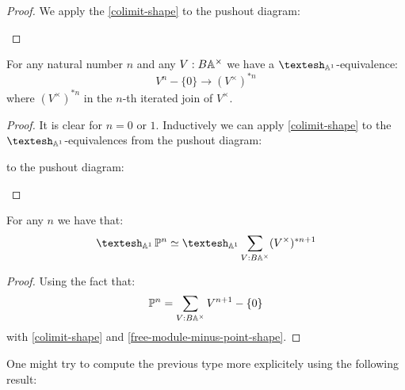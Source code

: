 \begin{proof}
We apply the \cref{colimit-shape} to the pushout diagram:
 \begin{center}
  \end{center}
  \end{proof}

\begin{lemma}\label{free-module-minus-point-shape}
For any natural number $n$ and any $V:B\mathbb{A}^\times$ we have a $\shape_{\A^1}$-equivalence:
\[V^{n}-\{0\} \to (V^\times)^{*n}\]
where $(V^\times)^{*n}$ in the $n$-th iterated join of $V^\times$.
\end{lemma}

\begin{proof}
It is clear for $n=0$ or $1$. Inductively we can apply \cref{colimit-shape} to the $\shape_{\A^1}$-equivalences from the pushout diagram:
 \begin{center}
  \end{center}
  to the pushout diagram:
   \begin{center}
  \end{center}
\end{proof}

\begin{proposition}
For any $n$ we have that:
\[\shape_{\A^1} \bP^n \simeq \shape_{\A^1} \sum_{V:B\A^\times} (V^\times)^{*n+1}\]
\end{proposition}

\begin{proof}
Using the fact that:
\[\mathbb{P}^n = \sum_{V:B\mathbb{A}^\times} V^{n+1}-\{0\}\]
with \cref{colimit-shape} and \cref{free-module-minus-point-shape}.
\end{proof}

One might try to compute the previous type more explicitely using the following result:

